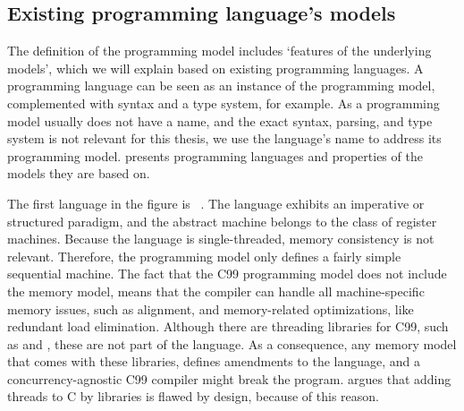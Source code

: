 \subsection{Existing programming language's models}

The definition of the programming model includes `features of the underlying models', which we will explain based on existing programming languages.
A programming language can be seen as an instance of the programming model, complemented with syntax and a type system, for example.
As a programming model usually does not have a name, and the exact syntax, parsing, and type system is not relevant for this thesis, we use the language's name to address its programming model.
 presents programming languages and properties of the models they are based on.

\begin{flipfigure}%
%
\caption{%
	High-level overview of different programming models, indicating the models that are used in the compilation flow.
	The cross section of models that is exposed to the programmer, is indicated by the overlay.}%
\label{fig:progmodel:models}%
\end{flipfigure}

The first language in the figure is ~\cite{C99}.
The language exhibits an imperative or structured paradigm, and the abstract machine belongs to the class of register machines.
Because the language is single-threaded, memory consistency is not relevant.
Therefore, the programming model only defines a fairly simple sequential machine.
The fact that the C99 programming model does not include the memory model, means that the compiler can handle all machine-specific memory issues, such as alignment, and memory-related optimizations, like redundant load elimination.
Although there are threading libraries for C99, such as  and , these are not part of the language.
As a consequence, any memory model that comes with these libraries, defines amendments to the language, and a concurrency-agnostic C99 compiler might break the program.
 argues that adding threads to C by libraries is flawed by design, because of this reason.


